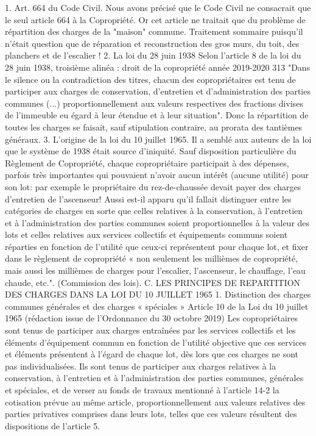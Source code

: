 		1. Art. 664 du Code Civil.
		Nous avons précisé que le Code Civil ne consacrait que le seul article 664 à la Copropriété. Or cet article ne traitait que du problème de répartition des charges de la "maison" commune.
		Traitement sommaire puisqu'il n'était question que de réparation et reconstruction des gros murs, du toit, des planchers et de l'escalier !
		2. La loi du 28 juin 1938
		Selon l'article 8 de la loi du 28 juin 1938, troisième alinéa :
		droit de la copropriété année 2019-2020
		313
		"Dans le silence ou la contradiction des titres, chacun des copropriétaires est tenu de participer aux charges de conservation, d'entretien et d'administration des parties communes (...) proportionnellement aux valeurs respectives des fractions divises de l'immeuble eu égard à leur étendue et à leur situation".
		Donc la répartition de toutes les charges se faisait, sauf stipulation contraire, au prorata des tantièmes généraux.
		3. L’origine de la loi du 10 juillet 1965.
		Il a semblé aux auteurs de la loi que le système de 1938 était source d'iniquité. Sauf disposition particulière du Règlement de Copropriété, chaque copropriétaire participait à des dépenses, parfois très importantes qui pouvaient n'avoir aucun intérêt (aucune utilité) pour son lot: par exemple le propriétaire du rez-de-chaussée devait payer des charges d'entretien de l'ascenseur!
		Aussi est-il apparu qu'il fallait distinguer entre les catégories de charges en sorte que celles relatives à la conservation, à l'entretien et à l'administration des parties communes soient proportionnelles à la valeur des lots et celles relatives aux services collectifs et équipements communs soient réparties en fonction de l'utilité que ceux-ci représentent pour chaque lot, et fixer dans le règlement de copropriété « non seulement les millièmes de copropriété, mais aussi les millièmes de charges pour l'escalier, l'ascenseur, le chauffage, l'eau chaude, etc.". (Commission des lois).
		C. LES PRINCIPES DE REPARTITION DES CHARGES DANS LA LOI DU 10 JUILLET 1965
		1. Distinction des charges communes générales et des charges « spéciales »
		Article 10 de la Loi du 10 juillet 1965 (rédaction issue de l’Ordonnance du 30 octobre 2019)
		Les copropriétaires sont tenus de participer aux charges entraînées par les services collectifs et les éléments d'équipement commun en fonction de l'utilité objective que ces services et éléments présentent à l'égard de chaque lot, dès lors que ces charges ne sont pas individualisées.
		Ils sont tenus de participer aux charges relatives à la conservation, à l'entretien et à l'administration des parties communes, générales et spéciales, et de verser au fonds de travaux mentionné à l'article 14-2 la cotisation prévue au même article, proportionnellement aux valeurs relatives des parties privatives comprises dans leurs lots, telles que ces valeurs résultent des dispositions de l'article 5.

